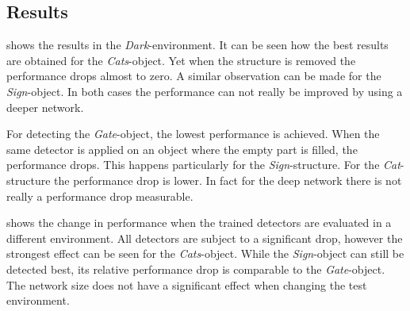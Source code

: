 \subsection{Results}

\begin{table}[hbtp]
	\centering
	
	\caption{Performance of two architectures when the test environment is similar to the training environment. Each trained network (row) is evaluated on each test set (column). It can be seen how the detectors exploit the structure that is placed in the object. In contrary, the detector of \acp{EWFO} only gets confused when the structure inside the object is very different from the training set.}
	\label{tab:all_basement}
\end{table}

 shows the results in the \textit{Dark}-environment. It can be seen how the best results are obtained for the \textit{Cats}-object. Yet when the structure is removed the performance drops almost to zero. A similar observation can be made for the \textit{Sign}-object. In both cases the performance can not really be improved by using a deeper network. 

For detecting the \textit{Gate}-object, the lowest performance is achieved. When the same detector is applied on an object where the empty part is filled, the performance drops. This happens particularly for the \textit{Sign}-structure. For the \textit{Cat}-structure the performance drop is lower. In fact for the deep network there is not really a performance drop measurable.



\begin{table}[hbtp]
	\centering
	
	\caption{Change in performance when the detectors are tested in another environment than their training environment. The most severe drop can be seen at the \textit{Cats}-object. The drop for \acp{EWFO} is comparable to the \textit{Sign}-object}
	\label{tab:diff_iros}
\end{table}

 shows the change in performance when the trained detectors are evaluated in a different environment. All detectors are subject to a significant drop, however the strongest effect can be seen for the \textit{Cats}-object. While the \textit{Sign}-object can still be detected best, its relative performance drop is comparable to the \textit{Gate}-object. The network size does not have a significant effect when changing the test environment.

